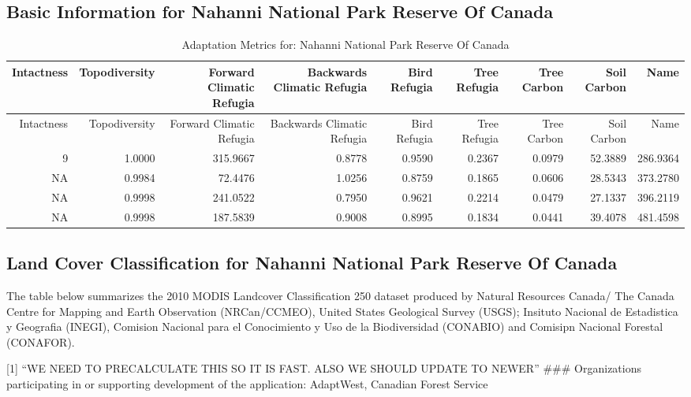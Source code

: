 \documentclass[
]{article}
\begin{document}
\hypertarget{basic-information-for-nahanni-national-park-reserve-of-canada}{%
\subsection{Basic Information for Nahanni National Park Reserve Of
Canada}\label{basic-information-for-nahanni-national-park-reserve-of-canada}}

\begin{longtable}[]{@{}rrrrrrrrr@{}}
\caption{Adaptation Metrics for: Nahanni National Park Reserve Of
Canada}\tabularnewline
\toprule
Intactness & Topodiversity & Forward Climatic Refugia & Backwards
Climatic Refugia & Bird Refugia & Tree Refugia & Tree Carbon & Soil
Carbon & Name\tabularnewline
\midrule
\endfirsthead
\toprule
Intactness & Topodiversity & Forward Climatic Refugia & Backwards
Climatic Refugia & Bird Refugia & Tree Refugia & Tree Carbon & Soil
Carbon & Name\tabularnewline
\midrule
\endhead
9 & 1.0000 & 315.9667 & 0.8778 & 0.9590 & 0.2367 & 0.0979 & 52.3889 &
286.9364\tabularnewline
NA & 0.9984 & 72.4476 & 1.0256 & 0.8759 & 0.1865 & 0.0606 & 28.5343 &
373.2780\tabularnewline
NA & 0.9998 & 241.0522 & 0.7950 & 0.9621 & 0.2214 & 0.0479 & 27.1337 &
396.2119\tabularnewline
NA & 0.9998 & 187.5839 & 0.9008 & 0.8995 & 0.1834 & 0.0441 & 39.4078 &
481.4598\tabularnewline
\bottomrule
\end{longtable}

\hypertarget{land-cover-classification-for-nahanni-national-park-reserve-of-canada}{%
\subsection{Land Cover Classification for Nahanni National Park Reserve
Of
Canada}\label{land-cover-classification-for-nahanni-national-park-reserve-of-canada}}

The table below summarizes the 2010 MODIS Landcover Classification 250
dataset produced by Natural Resources Canada/ The Canada Centre for
Mapping and Earth Observation (NRCan/CCMEO), United States Geological
Survey (USGS); Insituto Nacional de Estadistica y Geografia (INEGI),
Comision Nacional para el Conocimiento y Uso de la Biodiversidad
(CONABIO) and Comisipn Nacional Forestal (CONAFOR).

{[}1{]} ``WE NEED TO PRECALCULATE THIS SO IT IS FAST. ALSO WE SHOULD
UPDATE TO NEWER\nVERSION'' \#\#\# Organizations participating in or
supporting development of the application: AdaptWest, Canadian Forest
Service
\end{document}
